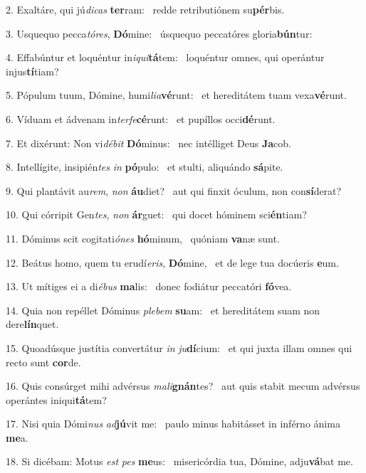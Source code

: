 2. Exaltáre, qui jú\textit{di}\textit{cas} \textbf{ter}ram: \ast\  redde retributiónem su\textbf{pér}bis.\

3. Usquequo pecca\textit{tó}\textit{res}, \textbf{Dó}mine: \ast\  úsquequo peccatóres gloria\textbf{bún}tur:\

4. Effabúntur et loquéntur in\textit{i}\textit{qui}\textbf{tá}tem: \ast\  loquéntur omnes, qui operántur injus\textbf{tí}tiam?\

5. Pópulum tuum, Dómine, humi\textit{li}\textit{a}\textbf{vé}runt: \ast\  et hereditátem tuam vexa\textbf{vé}runt.\

6. Víduam et ádvenam in\textit{ter}\textit{fe}\textbf{cé}runt: \ast\  et pupíllos occi\textbf{dé}runt.\

7. Et dixérunt: Non vi\textit{dé}\textit{bit} \textbf{Dó}minus: \ast\  nec intélliget Deus \textbf{Ja}cob.\

8. Intellígite, insipién\textit{tes} \textit{in} \textbf{pó}pulo: \ast\  et stulti, aliquándo \textbf{sá}pite.\

9. Qui plantávit au\textit{rem}, \textit{non} \textbf{áu}diet? \ast\  aut qui finxit óculum, non con\textbf{sí}derat?\

10. Qui córripit Gen\textit{tes}, \textit{non} \textbf{ár}guet: \ast\  qui docet hóminem sci\textbf{én}tiam?\

11. Dóminus scit cogitati\textit{ó}\textit{nes} \textbf{hó}minum, \ast\  quóniam \textbf{va}næ sunt.\

12. Beátus homo, quem tu erudí\textit{e}\textit{ris}, \textbf{Dó}mine, \ast\  et de lege tua docúeris \textbf{e}um.\

13. Ut mítiges ei a di\textit{é}\textit{bus} \textbf{ma}lis: \ast\  donec fodiátur peccatóri \textbf{fó}vea.\

14. Quia non repéllet Dóminus \textit{ple}\textit{bem} \textbf{su}am: \ast\  et hereditátem suam non dere\textbf{lín}quet.\

15. Quoadúsque justítia convertátur \textit{in} \textit{ju}\textbf{dí}cium: \ast\  et qui juxta illam omnes qui recto sunt \textbf{cor}de.\

16. Quis consúrget mihi advérsus \textit{ma}\textit{li}\textbf{gnán}tes? \ast\  aut quis stabit mecum advérsus operántes iniqui\textbf{tá}tem?\

17. Nisi quia Dómi\textit{nus} \textit{ad}\textbf{jú}vit me: \ast\  paulo minus habitásset in inférno ánima \textbf{me}a.\

18. Si dicébam: Motus \textit{est} \textit{pes} \textbf{me}us: \ast\  misericórdia tua, Dómine, adju\textbf{vá}bat me.\

